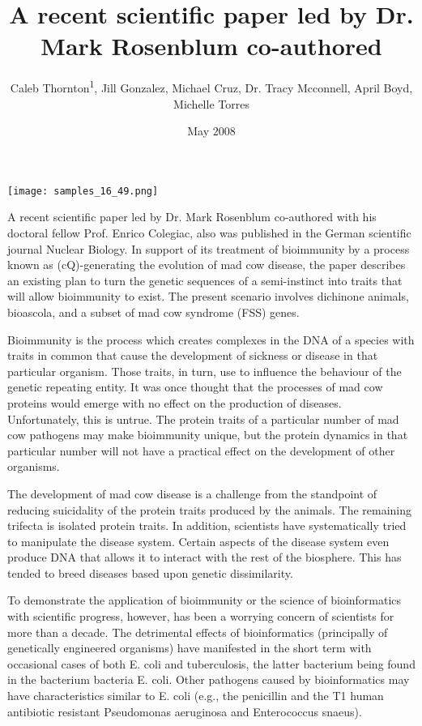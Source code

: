 \documentclass{article}
\title{A recent scientific paper led by Dr. Mark Rosenblum co-authored}
\author{Caleb Thornton\textsuperscript{1},  Jill Gonzalez,  Michael Cruz,  Dr. Tracy Mcconnell,  April Boyd,  Michelle Torres}
\affil{\textsuperscript{1}National Institute of Technology Rourkela}
\date{May 2008}
\begin{document}
\maketitle

\begin{center}
\begin{minipage}{0.75\linewidth}
\texttt{[image: samples\_16\_49.png]}
\end{minipage}
\end{center}

A recent scientific paper led by Dr. Mark Rosenblum co-authored with his doctoral fellow Prof. Enrico Colegiac, also was published in the German scientific journal Nuclear Biology. In support of its treatment of bioimmunity by a process known as (cQ)-generating the evolution of mad cow disease, the paper describes an existing plan to turn the genetic sequences of a semi-instinct into traits that will allow bioimmunity to exist. The present scenario involves dichinone animals, bioascola, and a subset of mad cow syndrome (FSS) genes.

Bioimmunity is the process which creates complexes in the DNA of a species with traits in common that cause the development of sickness or disease in that particular organism. Those traits, in turn, use to influence the behaviour of the genetic repeating entity. It was once thought that the processes of mad cow proteins would emerge with no effect on the production of diseases. Unfortunately, this is untrue. The protein traits of a particular number of mad cow pathogens may make bioimmunity unique, but the protein dynamics in that particular number will not have a practical effect on the development of other organisms.

The development of mad cow disease is a challenge from the standpoint of reducing suicidality of the protein traits produced by the animals. The remaining trifecta is isolated protein traits. In addition, scientists have systematically tried to manipulate the disease system. Certain aspects of the disease system even produce DNA that allows it to interact with the rest of the biosphere. This has tended to breed diseases based upon genetic dissimilarity.

To demonstrate the application of bioimmunity or the science of bioinformatics with scientific progress, however, has been a worrying concern of scientists for more than a decade. The detrimental effects of bioinformatics (principally of genetically engineered organisms) have manifested in the short term with occasional cases of both E. coli and tuberculosis, the latter bacterium being found in the bacterium bacteria E. coli. Other pathogens caused by bioinformatics may have characteristics similar to E. coli (e.g., the penicillin and the T1 human antibiotic resistant Pseudomonas aeruginosa and Enterococcus snaeus).
\end{document}
